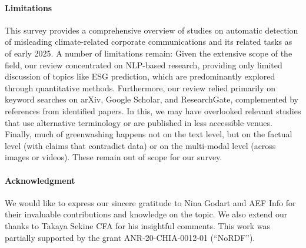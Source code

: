 \paragraph{Limitations} This survey provides a comprehensive overview of studies on automatic detection of misleading
climate-related corporate communications and its related tasks as of early 2025. A number of limitations remain: Given the extensive scope of the field, our review concentrated on NLP-based research, providing only limited discussion of topics like ESG prediction, which are predominantly explored through quantitative methods. Furthermore, our review relied  primarily on keyword searches on arXiv, Google Scholar, and ResearchGate, complemented by references from identified papers. In this, we may have overlooked %
relevant studies that use alternative terminology or are published in less accessible venues. Finally, much of greenwashing happens not on the text level, but on the factual level (with claims that contradict data) or on the multi-modal level (across images or videos). These remain out of scope for our survey.

\paragraph{Acknowledgment} We would like to express our sincere gratitude to Nina Godart and AEF Info for their invaluable contributions and knowledge on the topic. We also extend our thanks to Takaya Sekine CFA for his insightful comments. This work was partially supported by the grant ANR-20-CHIA-0012-01 (“NoRDF”).
